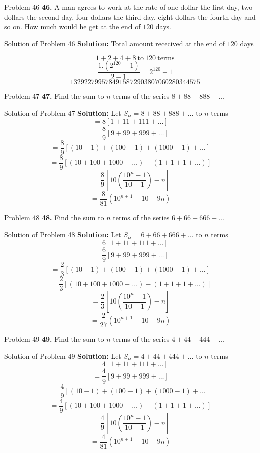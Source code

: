 \documentclass[aspectratio=1610,8pt]{beamer}
\begin{document}
\begin{frame}{Problem 46}
  \textbf{46.} A man agrees to work at the rate of one dollar the first day, two dollars the second day, four dollars the third
  day, eight dollars the fourth day and so on. How much would he get at the end of $120$ days.
\end{frame}
\begin{frame}{Solution of Problem 46}
  \textbf{Solution:} Total amount rececived at the end of $120$ days

  $$= 1 + 2 + 4 + 8~\text{to}~120~\text{terms}$$
  $$= \frac{1.(2^{120} - 1)}{2 - 1} = 2^{120} - 1$$
  $$= 1329227995784915872903807060280344575$$
\end{frame}
\begin{frame}{Problem 47}
  \textbf{47.} Find the sum to $n$ terms of the series $8 + 88 + 888 + \ldots$
\end{frame}
\begin{frame}{Solution of Problem 47}
  \textbf{Solution:} Let $S_n = 8 + 88 + 888 +  \ldots$ to $n$ terms
  $$= 8[1 + 11 + 111 + \ldots]$$
  $$ = \frac{8}{9}[9 + 99 + 999 + \ldots]$$
  $$= \frac{8}{9}[(10 - 1) + (100 - 1) + (1000 - 1) + \ldots]$$
  $$= \frac{8}{9}[(10 + 100 + 1000 + \ldots) - (1 + 1 + 1 + \ldots)]$$
  $$= \frac{8}{9}\left[10\left(\frac{10^n - 1}{10 - 1}\right) - n\right]$$
  $$= \frac{8}{81}(10^{n + 1} - 10 - 9n)$$
\end{frame}
\begin{frame}{Problem 48}
  \textbf{48.} Find the sum to $n$ terms of the series $6 + 66 + 666 + \ldots$
\end{frame}
\begin{frame}{Solution of Problem 48}
  \textbf{Solution:} Let $S_n = 6 + 66 + 666 +  \ldots$ to $n$ terms
  $$= 6[1 + 11 + 111 + \ldots]$$
  $$ = \frac{6}{9}[9 + 99 + 999 + \ldots]$$
  $$= \frac{2}{3}[(10 - 1) + (100 - 1) + (1000 - 1) + \ldots]$$
  $$= \frac{2}{3}[(10 + 100 + 1000 + \ldots) - (1 + 1 + 1 + \ldots)]$$
  $$= \frac{2}{3}\left[10\left(\frac{10^n - 1}{10 - 1}\right) - n\right]$$
  $$= \frac{2}{27}(10^{n + 1} - 10 - 9n)$$
\end{frame}
\begin{frame}{Problem 49}
  \textbf{49.} Find the sum to $n$ terms of the series $4 + 44 + 444 + \ldots$
\end{frame}
\begin{frame}{Solution of Problem 49}
  \textbf{Solution:} Let $S_n = 4 + 44 + 444 +  \ldots$ to $n$ terms
  $$= 4[1 + 11 + 111 + \ldots]$$
  $$ = \frac{4}{9}[9 + 99 + 999 + \ldots]$$
  $$= \frac{4}{9}[(10 - 1) + (100 - 1) + (1000 - 1) + \ldots]$$
  $$= \frac{4}{9}[(10 + 100 + 1000 + \ldots) - (1 + 1 + 1 + \ldots)]$$
  $$= \frac{4}{9}\left[10\left(\frac{10^n - 1}{10 - 1}\right) - n\right]$$
  $$= \frac{4}{81}(10^{n + 1} - 10 - 9n)$$
\end{frame}
\end{document}
